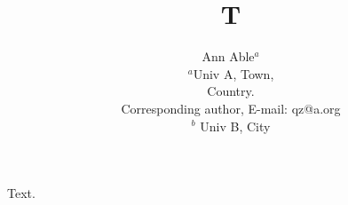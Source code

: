 \documentclass{article}
\title{T}
\author{Ann Able$^{a}$\\
{\small $^{a}$Univ A, Town,}\\
{\small Country.}\\
{\small * Corresponding author, E-mail: qz@a.org }\\
{\small $^{b}$ Univ B, City}\\
}
\date{}
\begin{document}
\maketitle
Text.
\end{document}
